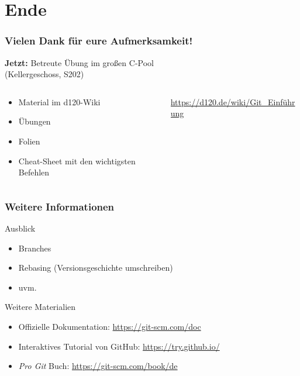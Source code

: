 \documentclass[accentcolor=tud8b,colorbacktitle,inverttitle,landscape,german,presentation,t]{tudbeamer}
\begin{document}
\section*{Ende}
		\begin{frame}
			\frametitle{Vielen Dank für eure Aufmerksamkeit!}
			\centering
			\Large{\textbf{Jetzt:} Betreute Übung im großen C-Pool\\(Kellergeschoss, S202)}\\
			\begin{columns}[T]
				\begin{column}{.5\textwidth}
					\begin{itemize}
						\item Material im d120-Wiki
						\item Übungen
						\item Folien
						\item Cheat-Sheet mit den wichtigsten Befehlen
					\end{itemize}
				\end{column}
				\begin{column}{.5\textwidth}
					\centering
					
					{\small\href{https://d120.de/wiki/Git_Einführung}{https://d120.de/wiki/Git\_Einführung}}
				\end{column}
			\end{columns}
		\end{frame}
		
		
			\begin{frame}
				\frametitle{Weitere Informationen}
					\begin{block}{Ausblick}
						\begin{itemize}
							\item Branches
							\item Rebasing (Versionsgeschichte umschreiben)
							\item uvm.
						\end{itemize}
					\end{block}
					\begin{block}{Weitere Materialien}
						\begin{itemize}
							\item Offizielle Dokumentation: \href{https://git-scm.com/doc}{https://git-scm.com/doc}
							\item Interaktives Tutorial von GitHub: \href{https://try.github.io/}{https://try.github.io/}
							\item \textit{Pro Git} Buch: \href{https://git-scm.com/book/de}{https://git-scm.com/book/de}
						\end{itemize}
					\end{block}
			\end{frame}
	
\end{document}
